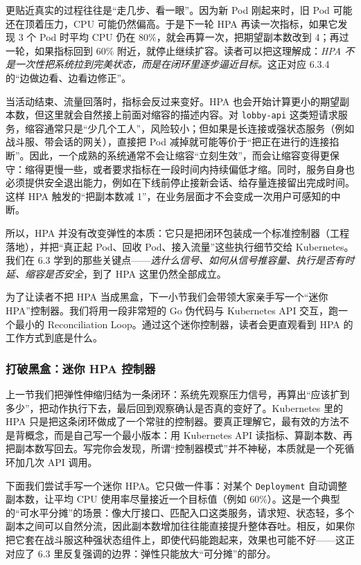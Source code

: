 更贴近真实的过程往往是“走几步、看一眼”。因为新 Pod 刚起来时，旧 Pod 可能还在顶着压力，CPU 可能仍然偏高。于是下一轮 HPA 再读一次指标，如果它发现 3 个 Pod 时平均 CPU 仍在 $80\%$，就会再算一次，把期望副本数改到 4；再过一轮，如果指标回到 $60\%$ 附近，就停止继续扩容。读者可以把这理解成：\emph{HPA 不是一次性把系统拉到完美状态，而是在闭环里逐步逼近目标。}这正对应 6.3.4 的“边做边看、边看边修正”。

当活动结束、流量回落时，指标会反过来变好。HPA 也会开始计算更小的期望副本数，但这里就会自然接上前面对缩容的描述内容。对 \texttt{lobby-api} 这类短请求服务，缩容通常只是“少几个工人”，风险较小；但如果是长连接或强状态服务（例如战斗服、带会话的网关），直接把 Pod 减掉就可能等价于“把正在进行的连接掐断”。因此，一个成熟的系统通常不会让缩容“立刻生效”，而会让缩容变得更保守：缩得更慢一些，或者要求指标在一段时间内持续偏低才缩。同时，服务自身也必须提供安全退出能力，例如在下线前停止接新会话、给存量连接留出完成时间。这样 HPA 触发的“把副本数减 1”，在业务层面才不会变成一次用户可感知的中断。

所以，HPA 并没有改变弹性的本质：它只是把闭环包装成一个标准控制器（工程落地），并把“真正起 Pod、回收 Pod、接入流量”这些执行细节交给 Kubernetes。我们在 6.3 学到的那些关键点——\emph{选什么信号、如何从信号推容量、执行是否有时延、缩容是否安全}，到了 HPA 这里仍然全部成立。

为了让读者不把 HPA 当成黑盒，下一小节我们会带领大家亲手写一个“迷你 HPA”控制器。我们将用一段非常短的 Go 伪代码与 Kubernetes API 交互，跑一个最小的 Reconciliation Loop。通过这个迷你控制器，读者会更直观看到 HPA 的工作方式到底是什么。

\subsubsection{打破黑盒：迷你 HPA 控制器}
上一节我们把弹性伸缩归结为一条闭环：系统先观察压力信号，再算出“应该扩到多少”，把动作执行下去，最后回到观察确认是否真的变好了。Kubernetes 里的 HPA 只是把这条闭环做成了一个常驻的控制器。要真正理解它，最有效的方法不是背概念，而是自己写一个最小版本：用 Kubernetes API 读指标、算副本数、再把副本数写回去。写完你会发现，所谓“控制器模式”并不神秘，本质就是一个死循环加几次 API 调用。

下面我们尝试手写一个迷你 HPA。它只做一件事：对某个 \texttt{Deployment} 自动调整副本数，让平均 CPU 使用率尽量接近一个目标值（例如 $60\%$）。这是一个典型的“可水平分摊”的场景：像大厅接口、匹配入口这类服务，请求短、状态轻，多个副本之间可以自然分流，因此副本数增加往往能直接提升整体吞吐。相反，如果你把它套在战斗服这种强状态组件上，即使代码能跑起来，效果也可能不好——这正对应了 6.3 里反复强调的边界：弹性只能放大“可分摊”的部分。

